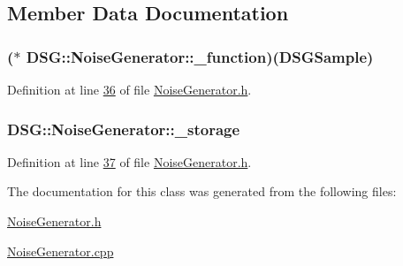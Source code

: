 \subsection{Member Data Documentation}
\hypertarget{class_d_s_g_1_1_noise_generator_a3fe30476196e0bfa22e314ce9bbd368b}{
\subsubsection[{\+\_\+function}]{($\ast$ D\+S\+G\+::\+Noise\+Generator\+::\+\_\+function)({\bf D\+S\+G\+Sample})\hspace{0.3cm}{\ttfamily [protected]}}}\label{class_d_s_g_1_1_noise_generator_a3fe30476196e0bfa22e314ce9bbd368b}


Definition at line \hyperlink{_noise_generator_8h_source_l00036}{36} of file \hyperlink{_noise_generator_8h_source}{Noise\+Generator.\+h}.

\hypertarget{class_d_s_g_1_1_noise_generator_adb363b56bb2f621849fa457d54fc46a6}{
\subsubsection[{\+\_\+storage}]{ D\+S\+G\+::\+Noise\+Generator\+::\+\_\+storage\hspace{0.3cm}{\ttfamily [protected]}}}\label{class_d_s_g_1_1_noise_generator_adb363b56bb2f621849fa457d54fc46a6}


Definition at line \hyperlink{_noise_generator_8h_source_l00037}{37} of file \hyperlink{_noise_generator_8h_source}{Noise\+Generator.\+h}.



The documentation for this class was generated from the following files\+:\begin{DoxyCompactItemize}
\item 
\hyperlink{_noise_generator_8h}{Noise\+Generator.\+h}\item 
\hyperlink{_noise_generator_8cpp}{Noise\+Generator.\+cpp}\end{DoxyCompactItemize}
